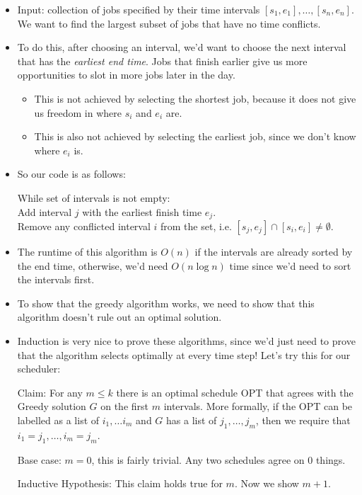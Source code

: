 	\begin{itemize}
		\item Input: collection of jobs specified by their time intervals $[s_1, e_1], \dots, [s_n, e_n]$. We
			want to find the largest subset of jobs that have no time conflicts.
		\item To do this, after choosing an interval, we'd want to choose the next interval that 
			has the \textit{earliest end time}. Jobs that finish earlier give us more opportunities to 
			slot in more jobs later in the day. 
			\begin{itemize}
				\item This is not achieved by selecting the shortest job, because it does not give us freedom 
					in where $s_i$ and $e_i$ are. 
				\item This is also not achieved by selecting the earliest job, since we don't know where $e_i$
					is. 
			\end{itemize}
		\item So our code is as follows:

			While set of intervals is not empty: \\
			Add interval $j$ with the earliest finish time $e_j$. \\
			Remove any conflicted interval $i$ from the set, i.e. $[s_j, e_j] \cap [s_i, e_i] \neq 
				\emptyset$.
		\item The runtime of this algorithm is $O(n)$ if the intervals are already sorted by the end time,
				otherwise, we'd need $O(n \log n)$ time since we'd need to sort the intervals first.
		\item To show that the greedy algorithm works, we need to show that this algorithm doesn't rule out 
			an optimal solution.
		\item Induction is very nice to prove these algorithms, since we'd just need to prove that 
			the algorithm selects optimally at every time step! Let's try this for our scheduler: 

			Claim: For any $m \le k$ there is an optimal schedule OPT that agrees with the Greedy solution 
			$G$ on the first $m$ intervals. More formally, if the OPT can be labelled as a list of $i_1, \dots
			i_m$ and $G$ has a list of $j_1, \dots, j_m$, then we require that $i_1 = j_1, \dots, i_m = j_m$.

			Base case: $m = 0$, this is fairly trivial. Any two schedules agree on 0 things.

			Inductive Hypothesis: This claim holds true for $m$. Now we show $m+1$. 


\end{itemize}
